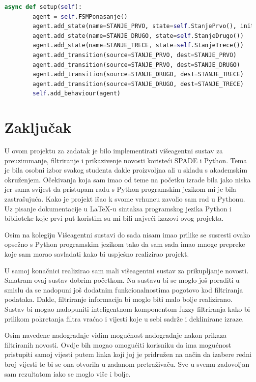 \documentclass[]{foi} %
\begin{document}
\begin{lstlisting}[language=Python, caption={Programski kôd za SearchAgent agenta}]
    async def setup(self):
        agent = self.FSMPonasanje()
        agent.add_state(name=STANJE_PRVO, state=self.StanjePrvo(), initial=True)
        agent.add_state(name=STANJE_DRUGO, state=self.StanjeDrugo())
        agent.add_state(name=STANJE_TRECE, state=self.StanjeTrece())
        agent.add_transition(source=STANJE_PRVO, dest=STANJE_PRVO)
        agent.add_transition(source=STANJE_PRVO, dest=STANJE_DRUGO)
        agent.add_transition(source=STANJE_DRUGO, dest=STANJE_TRECE)
        agent.add_transition(source=STANJE_DRUGO, dest=STANJE_TRECE)
        self.add_behaviour(agent)
\end{lstlisting}

\chapter{Zaključak}

U ovom projektu za zadatak je bilo implementirati višeagentni sustav za preuzimmanje, filtriranje i prikazivenje novosti koristeći SPADE i  Python. Tema je bila osobni izbor svakog studenta dakle proizvoljna ali u skladu s akademskim okruženjem. Očekivanja koja sam imao od teme  na početku izrade bila jako niska jer sama svijest da pristupam radu s Python programskim jezikom mi je bila zastrašujuća. Kako je projekt išao k svome vrhuncu zavolio sam rad u Pythonu. Uz pisanje dokumentacije u \LaTeX -u sintaksa programskog jezika Python i biblioteke koje prvi put koristim su mi bili najveći izazovi ovog projekta.

Osim na kolegiju Višeagentni sustavi do sada nisam imao prilike se susresti ovako opsežno s Python programskim jezikom tako da sam sada imao mnoge prepreke koje sam morao savladati kako bi uspješno realizirao projekt.

U samoj konačnici realizirao sam mali višeagentni sustav za prikupljanje novosti. Smatram ovaj sustav dobrim početkom. Na sustavu bi se moglo još poraditi u smislu da se nadopuni još dodatnim funkcionalnostima pogotovo kod filtriranja podataka. Dakle, filtriranje informacija bi moglo biti malo bolje realizirano. Sustav bi mogao nadopuniti inteligentnom komponentom fuzzy filtriranja kako bi prilikom pokretanja filtra vraćao i vijesti koje u sebi sadrže i deklinirane izraze.

Osim navedene nadogradnje vidim mogućnost nadogradnje nakon prikaza filtriranih novosti. Ovdje bih mogao omogućiti korisniku da ima mogućnost pristupiti samoj vijesti putem linka koji joj je pridružen na način da izabere redni broj vijesti te bi se ona otvorila u zadanom pretraživaču. Sve u svemu zadovoljan sam rezultatom iako se moglo više i bolje.
\makebackmatter



\end{document}
